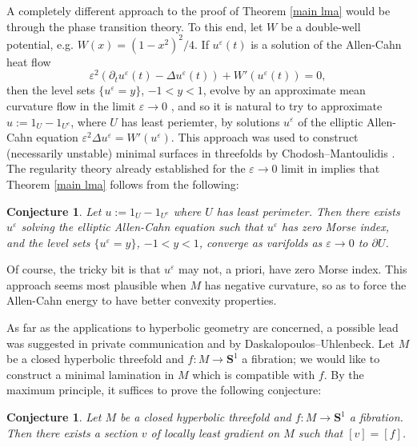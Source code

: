 \documentclass[reqno,10pt]{amsart}
\newcommand{\Sph}{\mathbf S}
\newtheorem{conjecture}[theorem]{Conjecture}
\theoremstyle{definition}
\numberwithin{equation}{section}
\begin{document}
A completely different approach to the proof of Theorem \ref{main lma} would be through the phase transition theory. 
To this end, let $W$ be a double-well potential, e.g. $W(x) = (1 - x^2)^2/4$.
If $u^\varepsilon(t)$ is a solution of the Allen-Cahn heat flow
$$\varepsilon^2(\partial_t u^\varepsilon(t) - \Delta u^\varepsilon(t)) + W'(u^\varepsilon(t)) = 0,$$
then the level sets $\{u^\varepsilon = y\}$, $-1 < y < 1$, evolve by an approximate mean curvature flow in the limit $\varepsilon \to 0$ \cite{Guaraco}, and so it is natural to try to approximate $u := 1_U - 1_{U^c}$, where $U$ has least periemter, by solutions $u^\varepsilon$ of the elliptic Allen-Cahn equation $\varepsilon^2 \Delta u^\varepsilon = W'(u^\varepsilon)$.
This approach was used to construct (necessarily unstable) minimal surfaces in threefolds by Chodosh--Mantoulidis \cite{Chodosh_2020}.
The regularity theory already established for the $\varepsilon \to 0$ limit in \cite[Appendix B]{Guaraco} implies that Theorem \ref{main lma} follows from the following:

\begin{conjecture}
Let $u := 1_U - 1_{U^c}$ where $U$ has least perimeter. Then there exists $u^\varepsilon$ solving the elliptic Allen-Cahn equation such that $u^\varepsilon$ has zero Morse index, and the level sets $\{u^\varepsilon = y\}$, $-1 < y < 1$, converge as varifolds as $\varepsilon \to 0$ to $\partial U$.
\end{conjecture}

Of course, the tricky bit is that $u^\varepsilon$ may not, a priori, have zero Morse index.
This approach seems most plausible when $M$ has negative curvature, so as to force the Allen-Cahn energy to have better convexity properties.

As far as the applications to hyperbolic geometry are concerned, a possible lead was suggested in private communication and \cite[Problems 9.12--9.13]{daskalopoulos2020transverse} by Daskalopoulos--Uhlenbeck.
Let $M$ be a closed hyperbolic threefold and $f: M \to \Sph^1$ a fibration; we would like to construct a minimal lamination in $M$ which is compatible with $f$.
By the maximum principle, it suffices to prove the following conjecture:

\begin{conjecture}
Let $M$ be a closed hyperbolic threefold and $f: M \to \Sph^1$ a fibration.
Then there exists a section $v$ of locally least gradient on $M$ such that $[v] = [f]$.
\end{conjecture}
\end{document}
